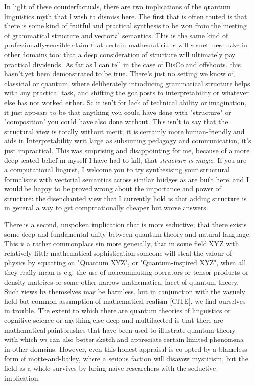 In light of these counterfactuals, there are two implications of the quantum linguistics myth that I wish to dismiss here. The first that is often touted is that there is some kind of fruitful and practical synthesis to be won from the meeting of grammatical structure and vectorial semantics. This is the same kind of professionally-sensible claim that certain mathematicians will sometimes make in other domains too: that a deep consideration of structure will ultimately pay practical dividends. As far as I can tell in the case of DisCo and offshoots, this hasn't yet been demonstrated to be true. There's just no setting we know of, classicial or quantum, where deliberately introducing grammatical structure helps with any practical task, and shifting the goalposts to interpretability or whatever else has not worked either. So it isn't for lack of technical ability or imagination, it just appears to be that anything you could have done with "structure" or "composition" you could have also done without. This isn't to say that the structural view is totally without merit; it is certainly more human-friendly and aids in Interpretability writ large as subsuming pedagogy and communication, it's just impractical. This was surprising and disappointing for me, because of a more deep-seated belief in myself I have had to kill, that \emph{structure is magic}. If you are a computational linguist, I welcome you to try synthesising your structural formalisms with vectorial semantics across similar bridges as are built here, and I would be happy to be proved wrong about the importance and power of structure: the disenchanted view that I currently hold is that adding structure is in general a way to get computationally cheaper but worse answers.

There is a second, unspoken implication that is more seductive; that there exists some deep and fundamental unity between quantum theory and natural language. This is a rather commonplace sin more generally, that in some field XYZ with relatively little mathematical sophistication someone will steal the valour of physics by squatting on "Quantum XYZ", or "Quantum-inspired XYZ", when all they really mean is e.g. the use of noncommuting operators or tensor products or density matrices or some other narrow mathematical facet of quantum theory. Such views by themselves may be harmless, but in conjunction with the vaguely held but common assumption of mathematical realism [CITE], we find ourselves in trouble. The extent to which there are quantum theories of linguistics or cognitive science or anything else deep and multifaceted is that there are mathematical paintbrushes that have been used to illustrate quantum theory with which we can also better sketch and appreciate certain limited phenomena in other domains. However, even this honest appraisal is co-opted by a blameless form of motte-and-bailey, where a serious faction will disavow mysticism, but the field as a whole survives by luring na\"{i}ve researchers with the seductive implication.

